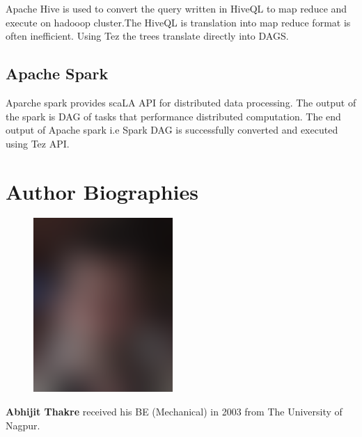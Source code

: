 \documentclass[9pt,twocolumn,twoside]{../../styles/osajnl}
\begin{document}
   Apache Hive is used to convert the query written in HiveQL to map reduce and execute on hadooop cluster.The HiveQL is translation into map reduce format is often inefficient. Using Tez the trees translate directly into DAGS.
               
 \subsection{Apache Spark}
         
 Aparche spark provides scaLA API for distributed data processing. The output of the spark is DAG of tasks that performance distributed computation. The end output of Apache spark i.e Spark DAG is successfully converted and executed using Tez API.


 \newpage



 
\section*{Author Biographies}
\begingroup
\setlength\intextsep{0pt}
\begin{minipage}[t][3.2cm][t]{1.0\columnwidth} %
  \begin{figure}
    \includegraphics[width=0.25\columnwidth]{images/john_smith.eps}
  \end{figure}
  \noindent
  {\bfseries Abhijit Thakre} received his BE (Mechanical) in 2003 from
  The University of Nagpur.
\end{minipage}
\endgroup


\appendix
\end{document}
